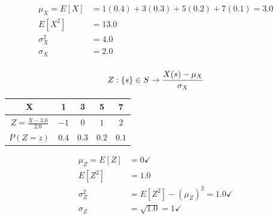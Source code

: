 \documentclass[12pt, a4paper]{article}
\begin{document}
\begin{align*}
	\mu_X = E[X] &=   1(0.4) + 3(0.3) + 5(0.2) + 7(0.1) = \boxed{3.0} \\
	E[X^2] &= 13.0 \\
	\sigma_{X}^2 &= \boxed{4.0} \\  
	\sigma_{X} &=  \boxed{2.0}\\
\end{align*}

$$
Z : \{ s \} \in S \rightarrow \frac{X(s) - \mu_X}{\sigma_X}  \\
$$

\begin{table}[h]
\centering
\begin{tabular}{|c|c|c|c|c|}
\hline
X & 1 & 3 & 5 & 7 \\
\hline
$Z = \frac{X - 3.0}{2.0}$ & $-1$ & $0$ & $1$ & $2$ \\
\hline
$P(Z = z)$ & $0.4$ & $0.3$ & $0.2$ & $0.1$ \\
\hline
\end{tabular}
\end{table}

\begin{align*}
	\mu_Z = E[Z] &= \boxed{0} \checkmark \\
	E[Z^2] &= 1.0 \\
	\sigma_Z^2 &= E[Z^2] - (\mu_Z)^2 = \boxed{1.0} \checkmark \\
	\sigma_Z &= \sqrt{1.0} = \boxed{1} \checkmark \\
\end{align*}

\end{document}
